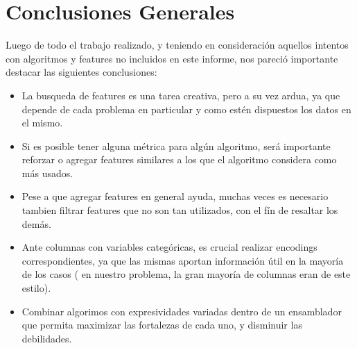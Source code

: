 \documentclass[a4paper ,12pt]{article}
\begin{document}
\newpage

\section{Conclusiones Generales}

Luego de todo el trabajo realizado, y teniendo en consideración aquellos intentos con algoritmos y features no incluidos en este informe, nos pareció importante destacar las siguientes conclusiones:


	\begin{itemize}
		
		\item La busqueda de features es una tarea creativa, pero a su vez ardua, ya que depende de cada problema en particular y como estén dispuestos los datos en el mismo.
		
		\item Si es posible tener alguna métrica para algún algoritmo, será importante reforzar o agregar features similares a los que el algoritmo considera como más usados.
		
		\item Pese a que agregar features en general ayuda, muchas veces es necesario tambien filtrar features que no son tan utilizados, con el fín de resaltar los demás.
		
		\item Ante columnas con variables categóricas, es crucial realizar encodings correspondientes, ya que las mismas aportan información útil en la mayoría de los casos ( en nuestro problema, la gran mayoría de columnas eran de este estilo).
		
		\item Combinar algorimos con expresividades variadas dentro de un ensamblador que permita maximizar las fortalezas de cada uno, y disminuir las debilidades.
		
		
		
	\end{itemize}
	
\newpage
\end{document}
